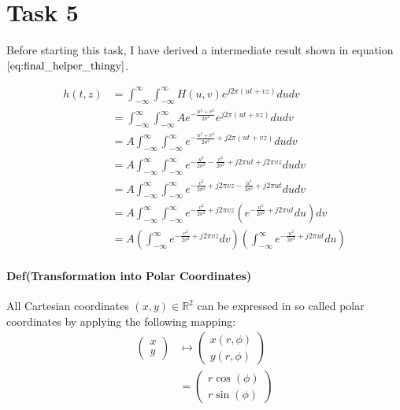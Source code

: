 \documentclass{paper}
\begin{document}
\section*{Task 5}

Before starting this task, I have derived a intermediate result shown in equation $\ref{eq:final_helper_thingy}$.


\begin{align}
    h(t,z) &= \int_{-\infty}^{\infty} \int_{-\infty}^{\infty} H(u,v) e^{j 2 \pi (ut + vz)} du dv \\
    &= \int_{-\infty}^{\infty} \int_{-\infty}^{\infty} A e^{-\frac{u^2 + v^2}{2 \sigma^2}} e^{j 2 \pi (ut + vz)} du dv \\
    &= A \int_{-\infty}^{\infty} \int_{-\infty}^{\infty} e^{-\frac{u^2 + v^2}{2 \sigma^2} + j 2 \pi (ut + vz)} du dv \\
    &= A \int_{-\infty}^{\infty} \int_{-\infty}^{\infty} e^{-\frac{u^2}{2 \sigma^2}-\frac{v^2}{2 \sigma^2} + j 2 \pi ut + j 2 \pi vz} du dv \\
    &= A \int_{-\infty}^{\infty} \int_{-\infty}^{\infty} e^{-\frac{v^2}{2 \sigma^2} + j 2 \pi vz -\frac{u^2}{2 \sigma^2} + j 2 \pi ut} du dv \\
    &= A \int_{-\infty}^{\infty} \int_{-\infty}^{\infty} e^{-\frac{v^2}{2 \sigma^2} + j 2 \pi vz} \left(e^{-\frac{u^2}{2 \sigma^2} + j 2 \pi ut} du \right) dv \\
    &= A \left(\int_{-\infty}^{\infty} e^{-\frac{v^2}{2 \sigma^2} + j 2 \pi vz} dv \right) \left( \int_{-\infty}^{\infty} e^{-\frac{u^2}{2 \sigma^2} + j 2 \pi ut} du \right)
\label{eq:first_res}
\end{align}










\paragraph{Def(Transformation into Polar Coordinates)} All Cartesian coordinates $(x,y) \in \mathbb{R}^2$ can be expressed in so called polar coordinates by applying the following mapping:
\begin{align}
\begin{pmatrix}x\\y\end{pmatrix} 
    &\mapsto \begin{pmatrix}x(r,\phi)\\y(r, \phi)\end{pmatrix} \\
    &= \begin{pmatrix}r \cos(\phi)\\r \sin(\phi)\end{pmatrix}
\label{eq:polar_coordinates}
\end{align}
\end{document}
